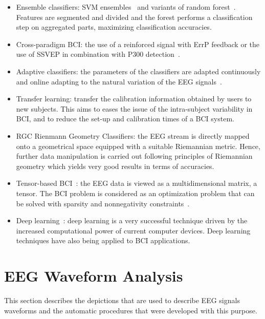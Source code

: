 \begin{itemize}
\item Ensemble classifiers: SVM ensembles~\cite{Rakotomamonjy2008} and variants of random forest~\cite{Steyrl2015}.  Features are segmented and divided and the forest performs a classification step on aggregated parts, maximizing classification accuracies.
\item Cross-paradigm BCI: the use of a reinforced signal with ErrP feedback or the use of SSVEP in combination with P300 detection~\cite{Lotte2018}.
\item Adaptive classifiers: the parameters of the classifiers are adapted continuously and online adapting to the natural variation of the EEG signals~\cite{Lotte2018}.
\item Transfer learning: transfer the calibration information obtained by users to new subjects.  This aims to eases the issue of the intra-subject variability in BCI, and to reduce the set-up and calibration times of a BCI system.
\item RGC Rienmann Geometry Classifiers: the EEG stream is directly mapped onto a geometrical space equipped with a suitable Riemannian metric.  Hence, further data manipulation is carried out following principles of Riemannian geometry which yields very good results in terms of accuracies.
\item Tensor-based BCI~\cite{Cichocki2008}:  the EEG data is viewed as a multidimensional matrix, a tensor.  The BCI problem is considered as an optimization problem that can be solved with sparsity and nonnegativity constraints~\cite{Vincent2010}.
\item Deep learning~\cite{Tjepkema-Cloostermans2018}: deep learning is a very successful technique driven by the increased computational power of current computer devices.  Deep learning techniques have also being applied to BCI applications.
\end{itemize}


\section{EEG Waveform Analysis}

This section describes the depictions that are used to describe EEG signals waveforms and the automatic procedures that were developed with this purpose.

